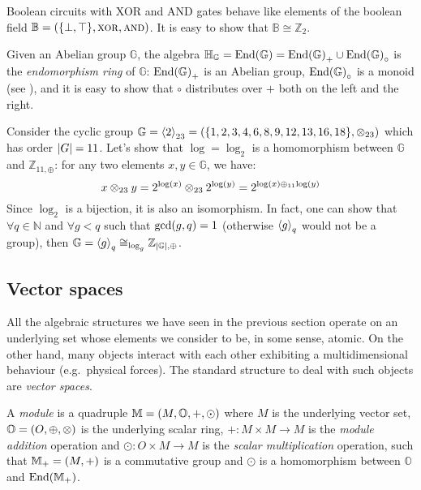 \begin{example}
  Boolean circuits with XOR and AND gates behave like elements of the boolean 
  field \(\mathbb{B} = \Tuple{\Set{\bot, \top}, \bitxor, \bitand} \).
  It is easy to show that \(\mathbb{B} \cong \mathbb{Z}_2\).
\end{example}

\begin{example}
  Given an Abelian group \(\mathbb{G}\), the algebra \(\mathbb{H}_{\mathbb{G}} = 
  \Endset{\mathbb{G}} = \Endset{\mathbb{G}}_{+} \cup \Endset{\mathbb{G}}_{\circ}\) 
  is the \emph{endomorphism ring} of \(\mathbb{G}\): \(\Endset{\mathbb{G}}_{+}\) is an Abelian 
  group, \(\Endset{\mathbb{G}}_{\circ}\) is a monoid 
  (see ), and it is easy to show that \(\circ \)
  distributes over \(+\) both on the left and the right.
\end{example}

\begin{example}\label{ex:cyclic_group}
  Consider the cyclic group 
  \(\mathbb{G} = \gengroup{2}_{23} = \Tuple{\Set{1, 2, 3, 4, 6, 8, 9, 12, 13, 16, 18}, \otimes_{23}}\)
  which has order \(\left\lvert G\right\rvert = 11\).
  Let's show that \(\log = \log_2\) is a homomorphism between \(\mathbb{G}\) and 
  \(\mathbb{Z}_{11,\oplus}\): for any two elements \(x, y \in \mathbb{G}\), 
  we have:
  \[
    x \otimes_{23} y = 2^{\log\left(x\right)} \otimes_{23} 2^{\log\left(y\right)} = 
    2^{\log\left(x\right) \oplus_{11} \log\left(y\right)}
  \]
  Since \(\log_2\) is a bijection, it is also an isomorphism.
  In fact, one can show that \(\forall q \in \mathbb{N}\) and \(\forall g < q\) such 
  that \(\call{\gcd}{g, q} = 1\) (otherwise \(\left\langle g\right\rangle_{q}\) would not be a group), then
  \(\mathbb{G} = \left\langle g\right\rangle_{q} \cong_{\log_g} \mathbb{Z}_{\left\lvert\mathbb{G}\right\rvert,\oplus}\).
\end{example}

\subsection{Vector spaces}
All the algebraic structures we have seen in the previous section operate on an underlying set 
whose elements we consider to be, in some sense, atomic.
On the other hand, many objects interact with each other exhibiting a multidimensional behaviour 
(e.g.\ physical forces).
The standard structure to deal with such objects are \emph{vector spaces}.
\begin{definition}[Module]
  A \emph{module} is a quadruple \(\mathbb{M} = \left(M, \mathbb{O}, +, \odot\right)\) where 
  \(M\) is the underlying vector set, \(\mathbb{O} = \left(O, \oplus, \otimes\right)\) is the underlying 
  scalar ring, \(+\colon M \times M \to M\) is the \emph{module addition} operation and 
  \(\odot\colon O \times M \to M\) is the \emph{scalar multiplication} operation, such that 
  \(\mathbb{M}_{+} = \left(M, +\right)\) is a commutative group and \(\odot \) is a homomorphism between 
  \(\mathbb{O}\) and \(\Endset{\mathbb{M}_{+}}\).
\end{definition} 

